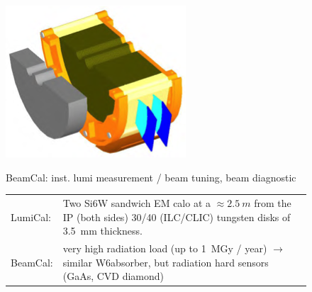 \begin{figure}
\begin{minipage}{\linewidth}
\begin{minipage}{.25\linewidth}
\includegraphics[width=\textwidth]{Calorimeter/FCAL/BeamCalPic.png}
    \end{minipage}
    \begin{minipage}{.24\linewidth}
        BeamCal: inst. lumi measurement / beam tuning, beam diagnostic
    \end{minipage}
\begin{tabularx}{\textwidth}{lX}
    {\color{red}LumiCal}: & Two Si6W sandwich EM calo at a $\approx\SI{2.5}{m}$ from the IP (both sides) 30/40 (ILC/CLIC) tungsten disks of \SI{3.5}{mm} thickness. \\
    {\color{red}BeamCal}: & very high radiation load (up to \SI{1}{MGy} / year) $\rightarrow$ similar W6absorber, but radiation hard sensors (GaAs, CVD diamond) \\
\end{tabularx}
\end{minipage}
\end{figure}

